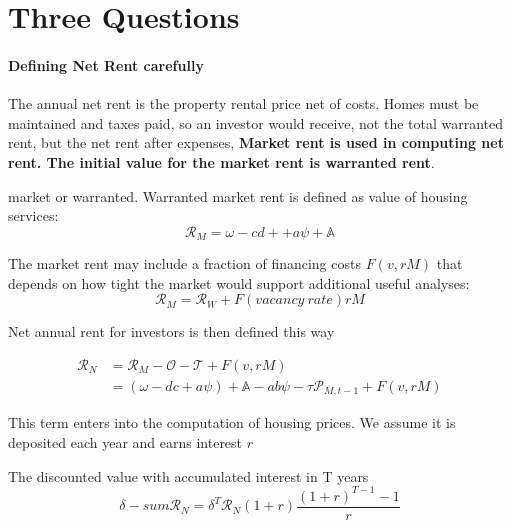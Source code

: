 \chapter{Three Questions}



\subsubsection{Defining Net Rent carefully}

The annual \gls{net rent} is the property rental price  net of costs. Homes must be maintained and taxes paid, so an investor would receive, not the total warranted rent, but the net rent after expenses,
\textbf{Market rent is used in computing net rent. The initial value for the market rent is \gls{warranted rent}}.

market or warranted.
Warranted market rent is defined as value of housing services:
\[\mathcal{R}_M = \omega - cd+ + a\psi + \mathbb{A}\]

The market rent may include  a fraction of financing costs $F(v, rM)$  that depends on how tight the market would support additional useful analyses:
 \[\mathcal{R}_M=\mathcal{R}_W + F(vacancy\ rate) rM\]

Net annual rent for investors is then  defined this way 

\begin{align}\mathcal{R}_N &= \mathcal{R}_M - \mathcal{O} - \mathcal{T} + F(v, rM)\nonumber\\
&= (\omega - {dc} + a\psi )+ \mathbb{A} - a b \psi - \tau  \mathcal{P}_{M, t-1}  + F(v, rM)
\end{align}

This term enters into the computation of housing prices. We assume it is deposited each year and earns interest $r$

The discounted value with accumulated interest in T years 
\[\delta-sum\mathcal{R}_N=\delta^T\mathcal{R}_N (1+r)\frac{(1+r)^{T-1}-1}{r} \]

